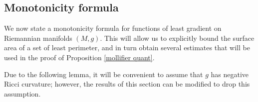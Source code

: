 

\subsection{Monotonicity formula}
We now state a monotonicity formula for functions of least gradient on Riemannian manifolds $(M, g)$.
This will allow us to explicitly bound the surface area of a set of least perimeter, and in turn obtain several estimates that will be used in the proof of Proposition \ref{mollifier quant}.

Due to the following lemma, it will be convenient to assume that $g$ has negative Ricci curvature; however, the results of this section can be modified to drop this assumption.

